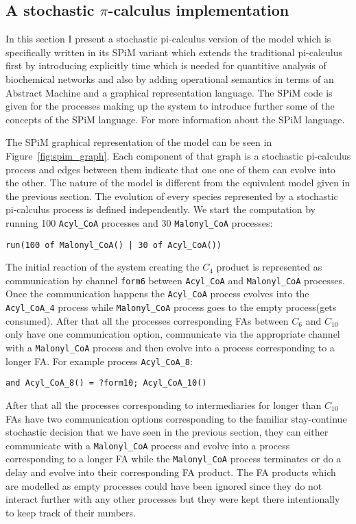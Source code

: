 \subsection{A stochastic $\pi$-calculus implementation}
In this section I present a stochastic pi-calculus version of the
model which is specifically written in its SPiM variant which extends
the traditional pi-calculus first by introducing explicitly time which
is needed for quantitive analysis of biochemical networks and also by
adding operational semantics in terms of an Abstract Machine and a
graphical representation language. The SPiM code is given for the
processes making up the system to introduce further some of the
concepts of the SPiM language. For more information about the SPiM
language.

The SPiM graphical representation of the model can be seen in
Figure~\ref{fig:spim_graph}. Each component of that graph is a
stochastic pi-calculus process and edges between them indicate that
one one of them can evolve into the other. The nature of the model is
different from the equivalent model given in the previous section. The
evolution of every species represented by a stochastic pi-calculus
process is defined independently. We start the computation by running 100
\texttt{Acyl\_CoA} processes and 30 \texttt{Malonyl\_CoA} processes:

\begin{verbatim}
run(100 of Malonyl_CoA() | 30 of Acyl_CoA())
\end{verbatim}

The initial reaction of the system creating the $C_4$ product is represented as
communication by channel \texttt{form6} between \texttt{Acyl\_CoA} and
\texttt{Malonyl\_CoA} processes. Once the communication happens the
\texttt{Acyl\_CoA} process evolves into the  \texttt{Acyl\_CoA\_4}
process while \texttt{Malonyl\_CoA} process goes to the empty
process(gets consumed). After that all the processes corresponding
FAs between $C_6$ and $C_{10}$ only have one communication option,
communicate via the appropriate channel with a \texttt{Malonyl\_CoA}
process and then evolve into a process corresponding to a longer
FA. For example process \texttt{Acyl\_CoA\_8}:

\begin{verbatim}
and Acyl_CoA_8() = ?form10; Acyl_CoA_10()
\end{verbatim}

After that all the processes corresponding to intermediaries for longer
than $C_{10}$ FAs have two communication options corresponding to the familiar
stay-continue stochastic decision that we have seen in the previous section, they
can either communicate with a \texttt{Malonyl\_CoA} process and evolve
into a process corresponding to a longer FA while the
\texttt{Malonyl\_CoA} process terminates or do a delay and evolve into
their corresponding FA product. The FA products which are modelled as
empty processes could have been ignored since they do not interact
further with any other processes but they were kept there
intentionally to keep track of their numbers.

